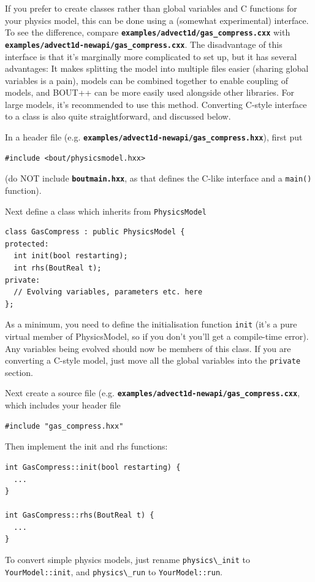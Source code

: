 \documentclass[12pt]{article}
\newcommand{\file}[1]{\texttt{\bf #1}}
\begin{document}
If you prefer to create classes rather than global variables and C functions for your physics model,
this can be done using a (somewhat experimental) interface. To see the difference,
compare \file{examples/advect1d/gas\_compress.cxx} with\\
\file{examples/advect1d-newapi/gas\_compress.cxx}. The disadvantage of this interface 
is that it's marginally more complicated to set up, but it has several advantages: It makes splitting
the model into multiple files easier (sharing global variables is a pain), models can be combined
together to enable coupling of models, and BOUT++ can be more easily used alongside other libraries. 
For large models, it's recommended to use this method. Converting
C-style interface to a class is also quite straightforward, and discussed below.

In a header file (e.g. \file{examples/advect1d-newapi/gas\_compress.hxx}), first put
\begin{lstlisting}
#include <bout/physicsmodel.hxx>
\end{lstlisting}
(do NOT include \file{boutmain.hxx}, as that defines the C-like interface and a \lstinline!main()! function).

Next define a class which inherits from \lstinline!PhysicsModel! 
\begin{lstlisting}
class GasCompress : public PhysicsModel {
protected:
  int init(bool restarting);
  int rhs(BoutReal t);
private:
  // Evolving variables, parameters etc. here
};
\end{lstlisting}
As a minimum, you need to define the initialisation function \lstinline!init! (it's a pure virtual
member of PhysicsModel, so if you don't you'll get a compile-time error). Any variables being evolved
should now be members of this class. If you are converting a C-style model, just move all the global variables into the \lstinline!private! section.

Next create a source file (e.g. \file{examples/advect1d-newapi/gas\_compress.cxx}, which
includes your header file
\begin{lstlisting}
#include "gas_compress.hxx"
\end{lstlisting}

Then implement the init and rhs functions:
\begin{lstlisting}
int GasCompress::init(bool restarting) {
  ...
}

int GasCompress::rhs(BoutReal t) {
  ...
}
\end{lstlisting}
To convert simple physics models, just rename \lstinline!physics\_init! to \lstinline!YourModel::init!,
and \lstinline!physics\_run! to \lstinline!YourModel::run!. 
\end{document}
